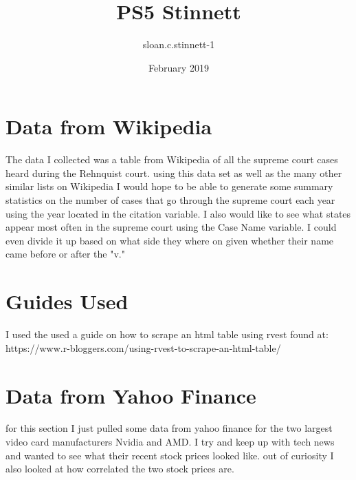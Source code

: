 \documentclass{article}
\title{PS5 Stinnett}
\author{sloan.c.stinnett-1 }
\date{February 2019}
\begin{document}
\maketitle

\section{Data from Wikipedia}
The data I collected was a table from Wikipedia of all the supreme court cases heard during the Rehnquist court. using this data set as well as the many other similar lists on Wikipedia I would hope to be able to generate some summary statistics on the number of cases that go through the supreme court each year using the year located in the citation variable. I also would like to see what states appear most often in the supreme court using the Case Name variable. I could even divide it up based on what side they where on given whether their name came before or after the "v."

\section{Guides Used}
I used the used a guide on how to scrape an html table using rvest found at: 
https://www.r-bloggers.com/using-rvest-to-scrape-an-html-table/

\section{Data from Yahoo Finance}
for this section I just pulled some data from yahoo finance for the two largest video card manufacturers Nvidia and AMD. I try and keep up with tech news and wanted to see what their recent stock prices looked like. out of curiosity I also looked at how correlated the two stock prices are. 
\end{document}
